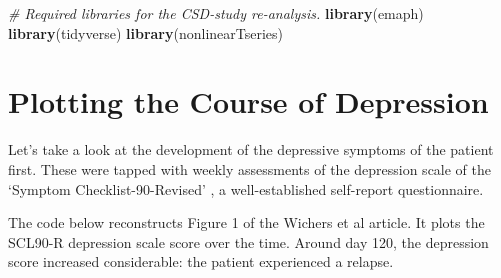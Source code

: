 \documentclass[]{book}
\newenvironment{Shaded}{\begin{snugshade}}{\end{snugshade}}
\newcommand{\KeywordTok}[1]{\textcolor[rgb]{0.13,0.29,0.53}{\textbf{#1}}}
\newcommand{\DataTypeTok}[1]{\textcolor[rgb]{0.13,0.29,0.53}{#1}}
\newcommand{\DecValTok}[1]{\textcolor[rgb]{0.00,0.00,0.81}{#1}}
\newcommand{\StringTok}[1]{\textcolor[rgb]{0.31,0.60,0.02}{#1}}
\newcommand{\CommentTok}[1]{\textcolor[rgb]{0.56,0.35,0.01}{\textit{#1}}}
\newcommand{\OperatorTok}[1]{\textcolor[rgb]{0.81,0.36,0.00}{\textbf{#1}}}
\newcommand{\NormalTok}[1]{#1}
\begin{document}

\begin{Shaded}
\begin{Highlighting}[]
\CommentTok{# Required libraries for the CSD-study re-analysis.}
\KeywordTok{library}\NormalTok{(emaph)}
\KeywordTok{library}\NormalTok{(tidyverse)}
\KeywordTok{library}\NormalTok{(nonlinearTseries)}
\end{Highlighting}
\end{Shaded}

\section{Plotting the Course of
Depression}\label{plotting-the-course-of-depression}

Let's take a look at the development of the depressive symptoms of the
patient first. These were tapped with weekly assessments of the
depression scale of the `Symptom Checklist-90-Revised'
\citep[SCL-90-R;][]{Derogatis1994}, a well-established self-report
questionnaire.

The code below reconstructs Figure 1 of the Wichers et al article. It
plots the SCL90-R depression scale score over the time. Around day 120,
the depression score increased considerable: the patient experienced a
relapse.

\begin{Shaded}
\end{Shaded}
\end{document}
